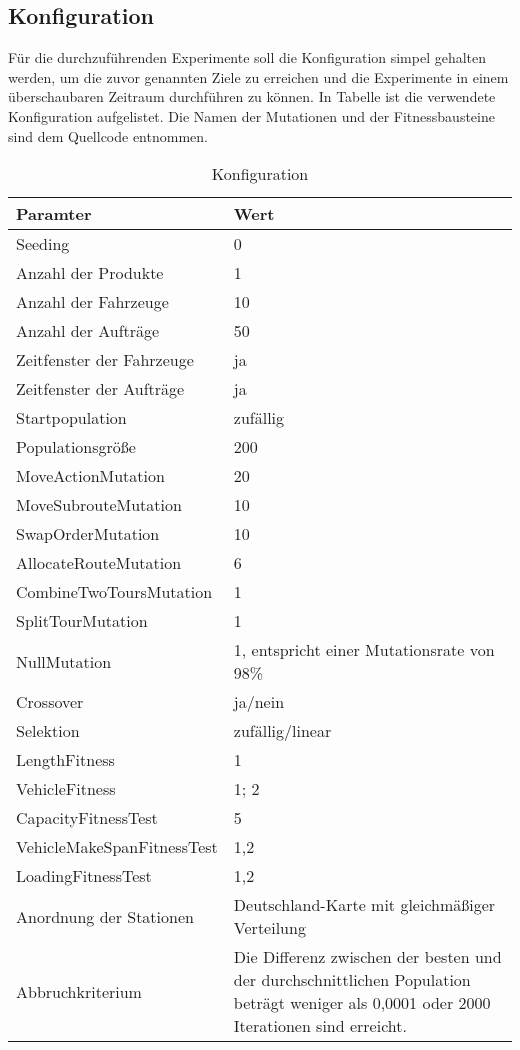 \subsection{Konfiguration}
\label{sec:Konfiguration}
Für die durchzuführenden Experimente soll die Konfiguration simpel gehalten werden, um die zuvor genannten Ziele zu erreichen und die Experimente in einem überschaubaren Zeitraum durchführen zu können. In Tabelle  ist die verwendete Konfiguration aufgelistet. Die Namen der Mutationen und der Fitnessbausteine sind dem Quellcode entnommen.

\begin{table}[ht!]
 \caption{Konfiguration}
 \begin{tabular}{lp{10cm}}
 \toprule
 \textbf {Paramter} & \textbf{Wert} \\
 \toprule
 Seeding & 0 \\
 \midrule
 Anzahl der Produkte & 1 \\
 \midrule
 Anzahl der Fahrzeuge & 10 \\
 \midrule
 Anzahl der Aufträge & 50 \\
 \midrule
 Zeitfenster der Fahrzeuge & ja \\
 \midrule
 Zeitfenster der Aufträge & ja \\
 \midrule
 Startpopulation & zufällig \\
 \midrule
 Populationsgröße & 200 \\
 \midrule
 MoveActionMutation & 20 \\
 \midrule
 MoveSubrouteMutation & 10 \\
 \midrule
 SwapOrderMutation & 10 \\
 \midrule
 AllocateRouteMutation & 6 \\
 \midrule
 CombineTwoToursMutation & 1 \\
 \midrule
 SplitTourMutation & 1 \\
 \midrule
 NullMutation & 1, entspricht einer Mutationsrate von 98\% \\
 \midrule
 Crossover & ja/nein \\
 \midrule
 Selektion & zufällig/linear \\
 \midrule
 LengthFitness & 1 \\
 \midrule
 VehicleFitness & 1; 2 \\
 \midrule
 CapacityFitnessTest & 5 \\
 \midrule
 VehicleMakeSpanFitnessTest & 1,2 \\
 \midrule
 LoadingFitnessTest & 1,2 \\
 \midrule
 Anordnung der Stationen & Deutschland-Karte mit gleichmäßiger Verteilung \\
 \midrule
 Abbruchkriterium & Die Differenz zwischen der besten und der durchschnittlichen Population beträgt weniger als 0,0001 oder 2000 Iterationen sind erreicht. \\
 \bottomrule
 \end{tabular}
 \label{tab:Konfiguration}
\end{table}

